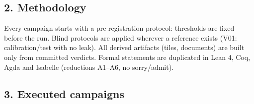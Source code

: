 \documentclass[11pt,a4paper]{article}
\begin{document}
\subsection{2. Methodology}

Every campaign starts with a pre-registration protocol: thresholds are fixed before the run. Blind protocols are applied wherever a reference exists (V01: calibration/test with no leak). All derived artifacts (tiles, documents) are built only from committed verdicts. Formal statements are duplicated in Lean 4, Coq, Agda and Isabelle (reductions A1–A6, no sorry/admit).

\subsection{3. Executed campaigns}
\end{document}
